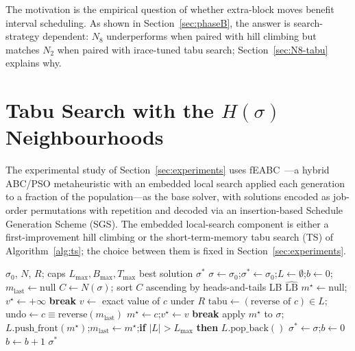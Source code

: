 \documentclass[preprint,12pt]{elsarticle}
\begin{document}
The motivation is the empirical question of whether extra-block moves benefit interval scheduling. As shown in Section~\ref{sec:phaseB}, the answer is search-strategy dependent: $N_8$ underperforms when paired with hill climbing but matches $N_2$ when paired with irace-tuned tabu search; Section~\ref{sec:N8-tabu} explains why.

\section{Tabu Search with the $H(\sigma)$ Neighbourhoods}
\label{sec:ts}

The experimental study of Section~\ref{sec:experiments} uses fEABC~\cite{DiazFEABC2023}---a hybrid ABC/PSO metaheuristic with an embedded local search applied each generation to a fraction of the population---as the base solver, with solutions encoded as job-order permutations with repetition and decoded via an insertion-based Schedule Generation Scheme (SGS). The embedded local-search component is either a first-improvement hill climbing or the short-term-memory tabu search (TS) of Algorithm~\ref{alg:ts}; the choice between them is fixed in Section~\ref{sec:experiments}.

\begin{algorithm}[H]
\caption{Tabu search with the $H(\sigma)$ neighbourhood (LS\_Tabu).}
\label{alg:ts}
\begin{algorithmic}[1]
\Require $\sigma_0$, $N$, $R$; caps $L_{\max}, B_{\max}, T_{\max}$
\Ensure best solution $\sigma^{\ast}$
\State $\sigma \gets \sigma_0$;\enspace $\sigma^{\ast} \gets \sigma_0$;\enspace $L \gets \emptyset$;\enspace $b \gets 0$;\enspace $m_{\text{last}} \gets \text{null}$
  \State $C \gets N(\sigma)$; sort $C$ ascending by heads-and-tails LB $\widehat{\text{LB}}$
  \State $m^{\star} \gets \text{null}$;\enspace $v^{\star} \gets +\infty$
    \enspace \textbf{break} 
    \EndIf
    \State $v \gets$ exact value of $c$ under $R$
    \State $\text{tabu} \gets (\text{reverse of }c) \in L$;\enspace $\text{undo} \gets c \equiv \text{reverse}(m_{\text{last}})$
      \State $m^{\star} \gets c$;\enspace $v^{\star} \gets v$ 
    \EndIf
  \EndFor
  \enspace \textbf{break} 
  \EndIf
  \State apply $m^{\star}$ to $\sigma$;\enspace $L.\text{push\_front}(m^{\star})$;\enspace $m_{\text{last}} \gets m^{\star}$;\enspace \textbf{if} $|L|>L_{\max}$ \textbf{then} $L.\text{pop\_back}()$
   \State $\sigma^{\ast} \gets \sigma$;\enspace $b \gets 0$
  \Else \State $b \gets b + 1$
  \EndIf
\EndWhile
\State \Return $\sigma^{\ast}$ \label{alg:ts:return}
\end{algorithmic}
\end{algorithm}
\end{document}
